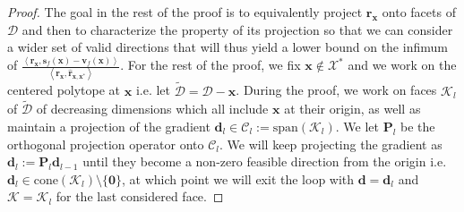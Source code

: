 \documentclass{article} %
\newcommand{\X}{\mathcal{X}}
\newcommand{\domain}{\mathcal{D}}
\newcommand{\x}{\bm{x}}
\newcommand{\s}{\bm{s}}
\newcommand{\dd}{\bm{d}}
\newcommand{\vv}{\bm{v}} %
\renewcommand{\r}{\bm{r}}
\newcommand{\innerProd}[2]{\left\langle #1 , #2 \right\rangle}
\newcommand{\C}{\mathcal{C}}
\newcommand{\proj}{\bm{P}}
\newcommand{\Kface}{\mathcal{K}}
\newcommand{\0}{\mathbf{0}} %
\begin{document}
\begin{proof}
The goal in the rest of the proof is to equivalently project $\r_{\x}$ onto facets of $\domain$ and then to characterize the property of its projection so that we can consider a wider set of valid directions that will thus yield a lower bound on the infimum of $\frac{\innerProd{\r_{\x}}{ \s_f(\x) - \vv_f(\x)}}{\innerProd{\r_{\x}}{ \hat{\r}_{\x,\x^*}}}$. For the rest of the proof, we fix $\x \notin \X^*$ and we work on the centered polytope at $\x$ i.e. let $\tilde{\domain} = \domain - \x$. During the proof, we work on faces $\Kface_l$ of $\tilde{\domain}$ of decreasing dimensions which all include $\x$ at their origin, as well as maintain a projection of the gradient $\dd_l \in \C_l := \text{span}(\Kface_l)$. We let $\proj_l$ be the orthogonal projection operator onto $\C_l$. We will keep projecting the gradient as $\dd_l := \proj_l \dd_{l-1}$ until they become a non-zero feasible direction from the origin i.e. $\dd_l \in \text{cone}(\Kface_l) \setminus \{\0\}$, at which point we will exit the loop with $\dd = \dd_l$ and $\Kface = \Kface_l$ for the last considered face. 


\end{proof}
\end{document}
